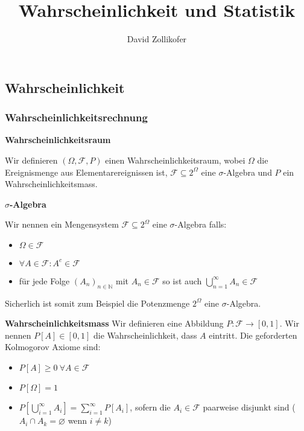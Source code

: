 \documentclass[25pt]{sciposter}
\title{\huge{Wahrscheinlichkeit und Statistik}}
\author{\large{David Zollikofer}}
\newcommand{\N}{\mathbb{N}}
\newcommand{\F}{\mathcal{F}}
\newenvironment{method}[1]{\begin{mdframed}[backgroundcolor=blue!10,innertopmargin=15pt, innerbottommargin=15pt,nobreak=true]
		\textbf{#1 }
	}
	{ 
	\end{mdframed}
}
\begin{document}
\maketitle



\begin{multicols}{3}

\part{Wahrscheinlichkeit}

\section{Wahrscheinlichkeitsrechnung}

\begin{method}{Wahrscheinlichkeitsraum}
	Wir definieren $(\Omega, \mathcal{F}, P)$ einen Wahrscheinlichkeitsraum, wobei $\Omega$ die Ereignismenge aus Elementarereignissen ist, $\F \subseteq 2^\Omega$ eine $\sigma$-Algebra und $P$ ein Wahrscheinlichkeitsmass.
\end{method}

\begin{method}{$\sigma$-Algebra}
	Wir nennen ein Mengensystem $\F\subseteq 2^\Omega$ eine $\sigma$-Algebra falls:
	\begin{itemize}
		\item $\Omega \in \F$
		\item $\forall A \in \F : A^c \in \F$
		\item für jede Folge $(A_n)_{n\in\N}$ mit $A_n \in \F$ so ist auch $\bigcup_{n=1}^\infty A_n \in \F $
	\end{itemize}

Sicherlich ist somit zum Beispiel die Potenzmenge $2^\Omega$ eine $\sigma$-Algebra.
\end{method}

\begin{method}{Wahrscheinlichkeitsmass} Wir definieren eine Abbildung $P: \F \to [0,1]$. Wir nennen $P[A]\in[0,1]$ die Wahrscheinlichkeit, dass $A$ eintritt. Die geforderten Kolmogorov Axiome sind:
	\begin{itemize}
		\item $P[A]\geq 0 \ \forall A \in \F$
		\item $P[\Omega] = 1$
		\item $P\left[ \bigcup_{i=1}^{\infty} A_i \right] = \sum_{i=1}^{\infty}P[A_i]$, sofern die $A_i \in \F$ paarweise disjunkt sind ($A_i \cap A_k = \varnothing$ wenn $i \neq k$) 
	\end{itemize}
\end{method}


\end{multicols}
\end{document}
